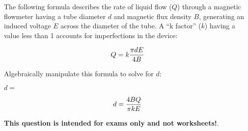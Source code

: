 

The following formula describes the rate of liquid flow ($Q$) through a magnetic flowmeter having a tube diameter $d$ and magnetic flux density $B$, generating an induced voltage $E$ across the diameter of the tube.  A ``k factor'' ($k$) having a value less than 1 accounts for imperfections in the device:

$$Q = k {\pi d E \over 4 B}$$

Algebraically manipulate this formula to solve for $d$:

\vskip 20pt

$d = $







$$d = {4 B Q \over \pi k E}$$







{\bf This question is intended for exams only and not worksheets!}.



